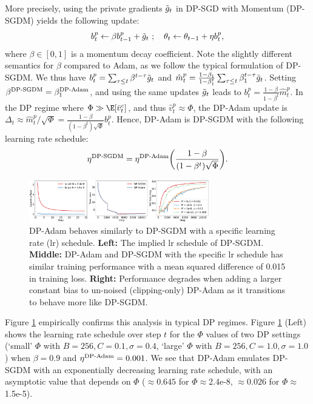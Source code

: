 \documentclass[letterpaper]{article} %
\begin{document}
More precisely, using the private gradients $\Tilde{g}_t$ in DP-SGD with Momentum (DP-SGDM) yields the following update:
\[
    b_t^{p} \leftarrow \beta b_{t-1}^{p} + \Tilde{g}_t \ ; \ \ \ \theta_t \leftarrow \theta_{t-1} + \eta b_t^{p} ,
\]
where $\beta \in [0, 1]$ is a momentum decay coefficient. Note the slightly different semantics for $\beta$ compared to Adam, as we follow the typical formulation of DP-SGDM.
%
We thus have $b_t^{p} = \sum_{\tau \leq t} \beta^{t-\tau} \Tilde{g}_t$ and $\hat{m}_t^{p} = \frac{1-\beta_1}{1-\beta_1^t} \sum_{\tau \leq t} \beta_1^{t-\tau} \Tilde{g}_t$.
%
Setting $\beta^{\textnormal{DP-SGDM}} = \beta_1^{\textnormal{DP-Adam}}$, and using the same updates $\Tilde{g}_t$ leads to $b_t^{p} = \frac{1-\beta}{1-\beta^t} \hat{m}_t^{p}$. In the DP regime where $\Phi \gg \E[\bar{v}^c_t]$, and thus $\hat{v}_t^{p} \approx \Phi$, the DP-Adam update is $\Delta_t \approx \hat{m}_t^{p} / \sqrt{\Phi} = \frac{1-\beta}{(1-\beta^t)\sqrt{\Phi}} b_t^{p}$. Hence, DP-Adam is DP-SGDM with the following learning rate schedule:
\begin{equation}
\label{eq:lr_convert}
    \eta^{\textnormal{DP-SGDM}} = \eta^{\textnormal{DP-Adam}} \bigg( \frac{1-\beta}{(1-\beta^t)\sqrt{\Phi}} \bigg).
\end{equation}

\begin{figure}[t]
\centering
\includegraphics[width=0.7\textwidth]{figs/type1_motiv_sgdm.pdf}
\caption{DP-Adam behaves similarly to DP-SGDM with a specific learning rate (lr) schedule. \textbf{Left: }The implied lr schedule of DP-SGDM. \textbf{Middle: } DP-Adam and DP-SGDM with the specific lr schedule has similar training performance with a mean squared difference of 0.015 in training loss. \textbf{Right: }Performance degrades when adding a larger constant bias to un-noised (clipping-only) DP-Adam as it transitions to behave more like DP-SGDM.}
\label{fig:motiv_sgdm}
\end{figure}

Figure \ref{fig:motiv_sgdm} empirically confirms this analysis in typical DP regimes.
Figure \ref{fig:motiv_sgdm} (Left) shows the learning rate schedule over step $t$ for the $\Phi$ values of two DP settings (`small' $\Phi$ with $B=256, C=0.1, \sigma=0.4$, `large' $\Phi$ with $B=256, C=1.0, \sigma=1.0$) when $\beta=0.9$ and $\eta^{\textnormal{DP-Adam}}=0.001$. We see that DP-Adam emulates DP-SGDM with an exponentially decreasing learning rate schedule, with an asymptotic value that depends on $\Phi$ ($\approx0.645$ for $\Phi\approx$2.4e-8, $\approx0.026$ for $\Phi\approx$1.5e-5).
\end{document}
